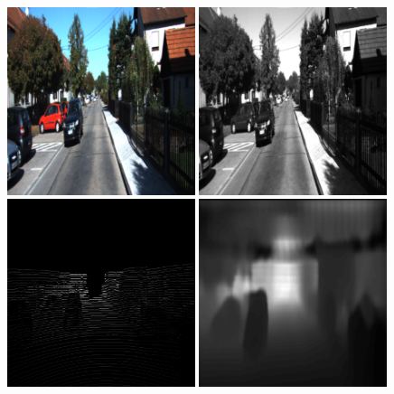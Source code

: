 \begin{figure}
\centering
\includegraphics[width=0.49\textwidth]{images/color.png}
\includegraphics[width=0.49\textwidth]{images/gray.png}
\includegraphics[width=0.49\textwidth]{images/lidar_depth.png}
\includegraphics[width=0.49\textwidth]{images/lidar_depth_int.png}

\end{figure}
